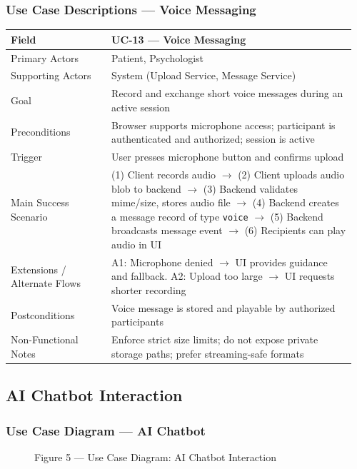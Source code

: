 \documentclass[12pt]{article}
\begin{document}
\subsubsection*{Use Case Descriptions --- Voice Messaging}
\begin{longtable}{L{0.28\linewidth} L{0.68\linewidth}}
\toprule
\textbf{Field} & \textbf{UC-13 --- Voice Messaging} \\
\midrule
\endhead
Primary Actors & Patient, Psychologist \\
Supporting Actors & System (Upload Service, Message Service) \\
Goal & Record and exchange short voice messages during an active session \\
Preconditions & Browser supports microphone access; participant is authenticated and authorized; session is active \\
Trigger & User presses microphone button and confirms upload \\
Main Success Scenario & (1) Client records audio $\rightarrow$ (2) Client uploads audio blob to backend $\rightarrow$ (3) Backend validates mime/size, stores audio file $\rightarrow$ (4) Backend creates a message record of type \texttt{voice} $\rightarrow$ (5) Backend broadcasts message event $\rightarrow$ (6) Recipients can play audio in UI \\
Extensions / Alternate Flows & A1: Microphone denied $\rightarrow$ UI provides guidance and fallback. A2: Upload too large $\rightarrow$ UI requests shorter recording \\
Postconditions & Voice message is stored and playable by authorized participants \\
Non-Functional Notes & Enforce strict size limits; do not expose private storage paths; prefer streaming-safe formats \\
\bottomrule
\end{longtable}

\subsection{AI Chatbot Interaction}
\subsubsection*{Use Case Diagram --- AI Chatbot}
\begin{figure}[h]
  \centering
  \caption{Figure 5 --- Use Case Diagram: AI Chatbot Interaction}
\end{figure}
\end{document}
